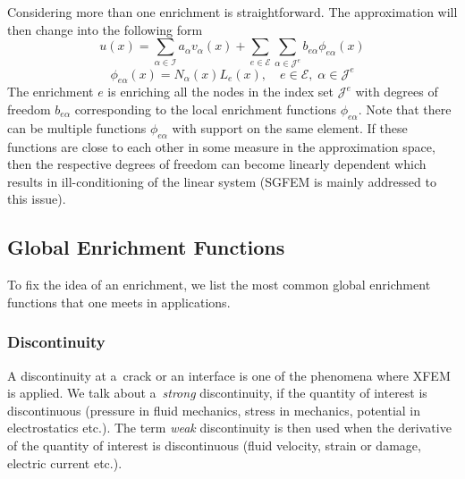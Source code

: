 Considering more than one enrichment is straightforward. The approximation will then change into the following form
\begin{equation} \label{eqn:soa_xfem_standard_form_mult1}
    u(x) = \sum_{\alpha\in\mathcal{I}}a_\alpha v_\alpha(x)
        + \sum_{e\in\mathcal{E}}\sum_{\alpha\in\mathcal{J}^e} b_{e\alpha} \phi_{e\alpha}(x)
\end{equation}
\begin{equation} \label{eqn:soa_xfem_standard_form_mult2}
    \phi_{e\alpha}(x) = N_\alpha(x)L_e(x), \quad e\in\mathcal{E},\; \alpha\in\mathcal{J}^e
\end{equation}
The enrichment $e$ is enriching all the nodes in the index set $\mathcal{J}^e$ with degrees of freedom $b_{e\alpha}$
corresponding to the local enrichment functions $\phi_{e\alpha}$. Note that there can be multiple functions $\phi_{e\alpha}$ with support on the same element. If these functions are close to each other in some measure in the approximation space, then the respective degrees of freedom can become linearly dependent which results in ill-conditioning of the linear system (SGFEM is mainly addressed to this issue).

\subsection{Global Enrichment Functions} \label{sec:global_enrichment}
To fix the idea of an enrichment, we list the most common global enrichment functions that one meets in applications.

\subsubsection{Discontinuity} \label{sec:glob_enr_discontinuity}

A discontinuity at a~crack or an interface is one of the phenomena where XFEM is applied.
We talk about a~\emph{strong} discontinuity, if the quantity of interest is discontinuous (pressure in fluid mechanics, stress in mechanics, potential in electrostatics etc.).
The term \emph{weak} discontinuity is then used when the derivative of the quantity of interest is discontinuous (fluid velocity, strain or damage, electric current etc.).

